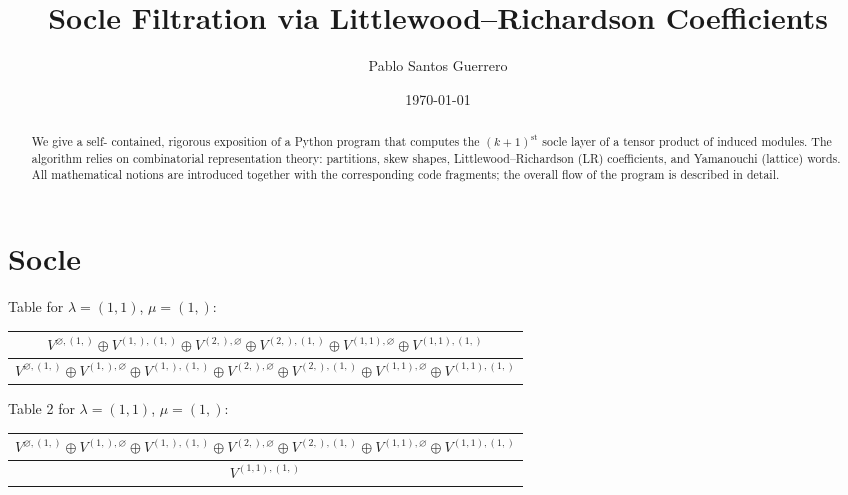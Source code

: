 \documentclass[a4paper,12pt]{article}
\title{Socle Filtration via Littlewood--Richardson Coefficients}
\author{Pablo Santos Guerrero}
\date{\today}
\begin{document}
\maketitle
\begin{abstract}
We give a self- contained, rigorous exposition of a Python program that computes the
\((k\!+\!1)^{\text{st}}\) socle layer of a tensor product of induced modules.
The algorithm relies on combinatorial representation theory:
partitions, skew shapes, Littlewood--Richardson (LR) coefficients, and
Yamanouchi (lattice) words.  
All mathematical notions are introduced together with the corresponding
code fragments; the overall flow of the program is described in detail.
\end{abstract}

\tableofcontents
\newpage

\section{Socle}

Table for $\lambda = (1, 1)$, $\mu = (1,)$:

\begin{table}[h]
\centering
\begin{tabular}{|c|}
\hline
$V^{\varnothing, (1,)} \oplus V^{(1,), (1,)} \oplus V^{(2,), \varnothing} \oplus V^{(2,), (1,)} \oplus V^{(1, 1), \varnothing} \oplus V^{(1, 1), (1,)}$  \\ \hline
$V^{\varnothing, (1,)} \oplus V^{(1,), \varnothing} \oplus V^{(1,), (1,)} \oplus V^{(2,), \varnothing} \oplus V^{(2,), (1,)} \oplus V^{(1, 1), \varnothing} \oplus V^{(1, 1), (1,)}$  \\ \hline
\end{tabular}
\end{table}

Table 2 for $\lambda = (1, 1)$, $\mu = (1,)$:

\begin{table}[h]
\centering
\begin{tabular}{|c|}
\hline
$V^{\varnothing, (1,)} \oplus V^{(1,), \varnothing} \oplus V^{(1,), (1,)} \oplus V^{(2,), \varnothing} \oplus V^{(2,), (1,)} \oplus V^{(1, 1), \varnothing} \oplus V^{(1, 1), (1,)} $ \\ \hline
 $V^{(1, 1), (1,)}$\\ \hline
\end{tabular}
\end{table}
\end{document}
